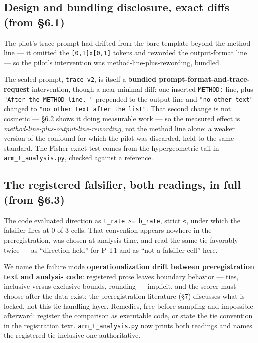 \subsection{Design and bundling disclosure, exact diffs (from \S6.1)}

The pilot's trace prompt had drifted from the bare template beyond the method line --- it omitted
the \texttt{[0,1]x[0,1]} tokens and reworded the output-format line --- so the pilot's intervention
was method-line-plus-rewording, bundled.

The scaled prompt, \texttt{trace\_v2}, is itself a \textbf{bundled prompt-format-and-trace-request}
intervention, though a near-minimal diff: one inserted \texttt{METHOD:} line, plus \texttt{"After
the METHOD line, "} prepended to the output line and \texttt{"no other text"} changed to
\texttt{"no other text after the list"}. That second change is not cosmetic --- \S6.2 shows it
doing measurable work --- so the measured effect is
\emph{method-line-plus-output-line-rewording}, not the method line alone: a weaker version of the
confound for which the pilot was discarded, held to the same standard. The Fisher exact test comes
from the hypergeometric tail in \texttt{arm\_t\_analysis.py}, checked against a reference.

\subsection{The registered falsifier, both readings, in full (from \S6.3)}

The code evaluated direction as \texttt{t\_rate >= b\_rate}, strict \texttt{<}, under which the
falsifier fires at 0 of 3 cells. That convention appears nowhere in the preregistration, was chosen
at analysis time, and read the same tie favorably twice --- as ``direction held'' for P-T1 and as
``not a falsifier cell'' here.

We name the failure mode \textbf{operationalization drift between preregistration text and analysis
code}: registered prose leaves boundary behavior --- ties, inclusive versus exclusive bounds,
rounding --- implicit, and the scorer must choose after the data exist; the preregistration
literature (\S7) discusses what is locked, not this tie-handling layer. Remedies, free before
sampling and impossible afterward: register the comparison as executable code, or state the tie
convention in the registration text. \texttt{arm\_t\_analysis.py} now prints both readings and names
the registered tie-inclusive one authoritative.

